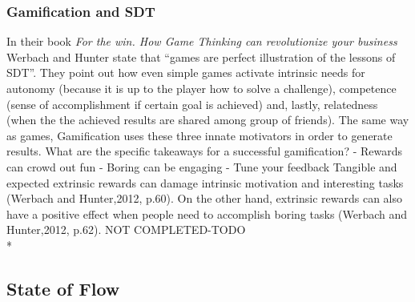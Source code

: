 \subsubsection{Gamification and SDT}
In their book \textit{For the win. How Game Thinking can revolutionize your business}  Werbach and Hunter state that ``games are perfect illustration of the lessons of SDT''. They point out how even simple games activate intrinsic needs for autonomy (because it is up to the player how to solve a challenge), competence (sense of accomplishment if certain goal is achieved) and, lastly, relatedness (when the the achieved results are shared among group of friends). The same way as games, Gamification uses these three innate motivators in order to generate results.
What are the specific takeaways for a successful gamification?
- Rewards can crowd out fun
- Boring can be engaging
- Tune your feedback
Tangible and expected extrinsic rewards can damage intrinsic motivation and interesting tasks (Werbach and Hunter,2012, p.60). On the other hand, extrinsic rewards can also have a positive effect when people need to accomplish boring
tasks (Werbach and Hunter,2012, p.62).
NOT COMPLETED-TODO
\\*

\subsection{State of Flow}

